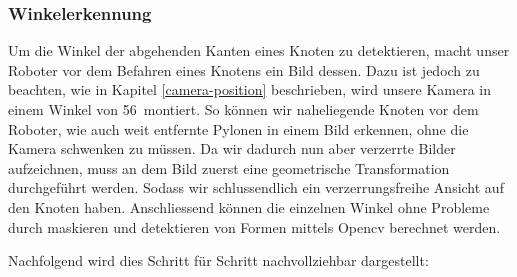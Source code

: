 \subsubsection{Winkelerkennung}\label{winkelerkennung}

Um die Winkel der abgehenden Kanten eines Knoten zu detektieren, macht unser Roboter vor dem Befahren eines Knotens ein Bild dessen. Dazu ist jedoch zu beachten, wie in Kapitel \ref{camera-position} beschrieben, wird unsere Kamera in einem Winkel von 56\textdegree\ montiert. So können wir naheliegende Knoten vor dem Roboter, wie auch weit entfernte Pylonen in einem Bild erkennen, ohne die Kamera schwenken zu müssen.
Da wir dadurch nun aber verzerrte Bilder aufzeichnen, muss an dem Bild zuerst eine geometrische Transformation durchgeführt werden. Sodass wir schlussendlich ein verzerrungsfreihe Ansicht auf den Knoten haben. Anschliessend können die einzelnen Winkel ohne Probleme durch maskieren und detektieren von Formen mittels Opencv berechnet werden.

Nachfolgend wird dies Schritt für Schritt nachvollziehbar dargestellt:

